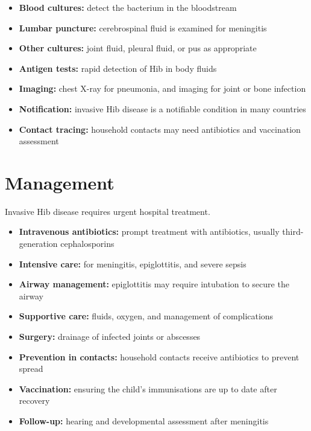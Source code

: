 \begin{itemize}
    \item \textbf{Blood cultures:} detect the bacterium in the bloodstream
    \item \textbf{Lumbar puncture:} cerebrospinal fluid is examined for meningitis
    \item \textbf{Other cultures:} joint fluid, pleural fluid, or pus as appropriate
    \item \textbf{Antigen tests:} rapid detection of Hib in body fluids
    \item \textbf{Imaging:} chest X-ray for pneumonia, and imaging for joint or bone infection
    \item \textbf{Notification:} invasive Hib disease is a notifiable condition in many countries
    \item \textbf{Contact tracing:} household contacts may need antibiotics and vaccination assessment
\end{itemize}

\section*{Management}
Invasive Hib disease requires urgent hospital treatment.

\begin{itemize}
    \item \textbf{Intravenous antibiotics:} prompt treatment with antibiotics, usually third-generation cephalosporins
    \item \textbf{Intensive care:} for meningitis, epiglottitis, and severe sepsis
    \item \textbf{Airway management:} epiglottitis may require intubation to secure the airway
    \item \textbf{Supportive care:} fluids, oxygen, and management of complications
    \item \textbf{Surgery:} drainage of infected joints or abscesses
    \item \textbf{Prevention in contacts:} household contacts receive antibiotics to prevent spread
    \item \textbf{Vaccination:} ensuring the child's immunisations are up to date after recovery
    \item \textbf{Follow-up:} hearing and developmental assessment after meningitis
\end{itemize}

